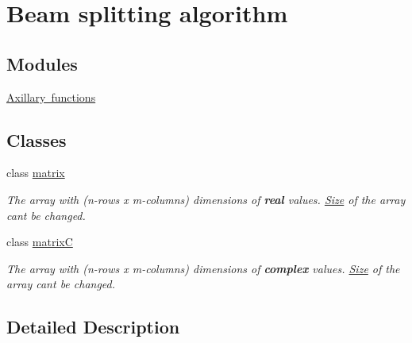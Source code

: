 \hypertarget{group___tracer}{}\section{Beam splitting algorithm}
\label{group___tracer}
\subsection*{Modules}
\begin{DoxyCompactItemize}
\item 
\mbox{\hyperlink{group___ax_func}{Axillary functions}}
\end{DoxyCompactItemize}
\subsection*{Classes}
\begin{DoxyCompactItemize}
\item 
class \mbox{\hyperlink{classmatrix}{matrix}}
\begin{DoxyCompactList}\small\item\em The array with (n-\/rows x m-\/columns) dimensions of {\bfseries real} values. \mbox{\hyperlink{struct_size}{Size}} of the array can\textquotesingle{}t be changed. \end{DoxyCompactList}\item 
class \mbox{\hyperlink{classmatrix_c}{matrixC}}
\begin{DoxyCompactList}\small\item\em The array with (n-\/rows x m-\/columns) dimensions of {\bfseries complex} values. \mbox{\hyperlink{struct_size}{Size}} of the array can\textquotesingle{}t be changed. \end{DoxyCompactList}\end{DoxyCompactItemize}


\subsection{Detailed Description}

